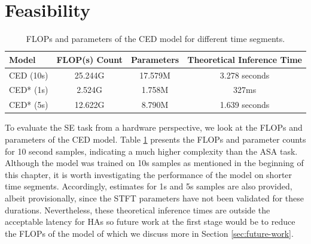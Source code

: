 \documentclass[logo,bsc,singlespacing,parskip,online]{infthesis}
\begin{document}
\section{Feasibility}
\begin{table}[h]
   \centering
   \begin{tabular}{lccc}
      \toprule
      Model & FLOP(s) Count & Parameters & Theoretical Inference Time\footnotemark \\
      \midrule
      CED (10s) & 25.244G & 17.579M & 3.278 seconds \\ %
      CED* (1s) & 2.524G & 1.758M & 327ms \\ %
      CED* (5s) & 12.622G & 8.790M & 1.639 seconds \\ %
      \bottomrule
   \end{tabular}
   \caption{FLOPs and parameters of the CED model for different time segments.}
   \label{tab:ced-model-metrics}
\end{table}
To evaluate the SE task from a hardware perspective, we look at the FLOPs and parameters of the CED model.
Table \ref{tab:ced-model-metrics} presents the FLOPs and parameter counts for 10 second samples, 
indicating a much higher complexity than the ASA task. Although the model was trained on 10s samples 
as mentioned in the beginning of this chapter, it is worth investigating the performance of the model 
on shorter time segments. Accordingly, estimates for 1s and 5s samples are also provided, albeit 
provisionally, since the STFT parameters have not been validated for these durations. Nevertheless,
these theoretical inference times are outside the acceptable latency for HAs so future work at 
the first stage would be to reduce the FLOPs of the model of which we discuss more in Section \ref{sec:future-work}.

\end{document}
